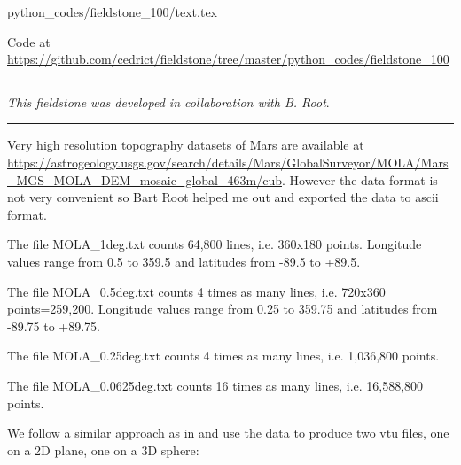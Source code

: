 \begin{flushright} {\tiny {\color{gray} python\_codes/fieldstone\_100/text.tex}} \end{flushright}



\begin{center}
Code at \url{https://github.com/cedrict/fieldstone/tree/master/python_codes/fieldstone_100}
\end{center}

\par\noindent\rule{\textwidth}{0.4pt}

{\sl This fieldstone was developed in collaboration with B. Root}. 

\par\noindent\rule{\textwidth}{0.4pt}

Very high resolution topography datasets of Mars are available at 
\url{https://astrogeology.usgs.gov/search/details/Mars/GlobalSurveyor/MOLA/Mars_MGS_MOLA_DEM_mosaic_global_463m/cub}.
However the data format is not very convenient so Bart Root 
helped me out and exported the data to ascii format.

The file {\filenamefont MOLA\_1deg.txt} counts 64,800 lines, 
i.e. 360x180 points. Longitude values range from  
0.5 to 359.5 and latitudes from -89.5 to +89.5. 

The file {\filenamefont MOLA\_0.5deg.txt} counts 4 times as many lines, 
i.e. 720x360 points=259,200. Longitude values range from  
0.25 to 359.75 and latitudes from -89.75 to +89.75. 

The file {\filenamefont MOLA\_0.25deg.txt} counts 4 times as many lines, 
i.e. 1,036,800 points.

The file {\filenamefont MOLA\_0.0625deg.txt} counts 16 times as many lines, 
i.e. 16,588,800 points.

We follow a similar approach as in  and use the data to produce 
two vtu files, one on a 2D plane, one on a 3D sphere:

